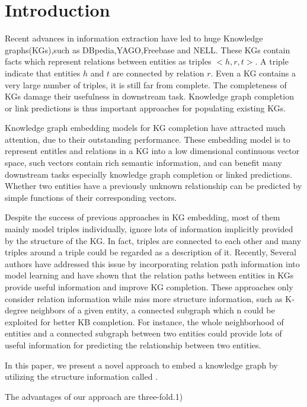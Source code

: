 \section{Introduction}
Recent advances in information extraction have led to huge Knowledge graphs(KGs),such as DBpedia,YAGO,Freebase and NELL. These KGs contain facts which represent relations between entities as triples $<h,r,t>$. A triple indicate that entities $h$ and $t$ are connected by relation $r$. Even a KG contains a very large number of triples, it is still far from complete. The completeness of KGs damage their usefulness in downstream task. Knowledge graph completion or link predictions is thus important approaches for populating existing KGs.

Knowledge graph embedding models for KG completion have attracted much attention, due to their outstanding performance. These embedding model is to represent entitles and relations in a KG into a low dimensional continuous vector space, such vectors contain rich semantic information, and can benefit many downstream tasks especially knowledge graph completion or linked predictions.  Whether two entities have a previously unknown relationship can be predicted by simple functions of their corresponding vectors. 

Despite the success of previous approaches in KG embedding, most of them mainly model triples individually, ignore lots of information implicitly provided by the structure of the KG. In fact, triples are connected to each other and many triples around a triple could be regarded as a description of it. Recently, Several authors have addressed this issue by incorporating relation path information into model learning and have shown that the relation paths between entities in KGs provide useful information and improve KG completion. These approaches only consider relation information while miss more structure information, such as K-degree neighbors of a given entity, a connected subgraph which n could be exploited for better KB completion. For instance, the whole neighborhood of entities and a connected subgraph between two entities could provide lots of useful information for predicting the relationship between two entities.

In this paper, we present a novel approach to embed a knowledge graph by utilizing the structure information called .

The advantages of our approach are three-fold.1)



